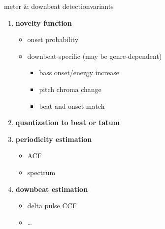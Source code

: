             \begin{frame}{meter \& downbeat detection}{variants}
                \begin{enumerate}
                    \item	\textbf{novelty function}
                        \begin{itemize}
                            \item   onset probability
                            \item   downbeat-specific (may be genre-dependent)
                                \begin{itemize}
                                    \item   bass onset/energy increase
                                    \item   pitch chroma change
                                    \item   beat and onset match
                                \end{itemize}
                        \end{itemize}
                    \smallskip
                    \item<2->	\textbf{quantization to beat or tatum}
                    \smallskip
                    \item<3->	\textbf{periodicity estimation}
                        \begin{itemize}
                            \item   ACF
                            \item   spectrum
                        \end{itemize}
                    \smallskip
                    \item<4->	\textbf{downbeat estimation} 
                        \begin{itemize}
                            \item   delta pulse CCF
                            \item   \ldots
                        \end{itemize}
                \end{enumerate}
            \end{frame}

